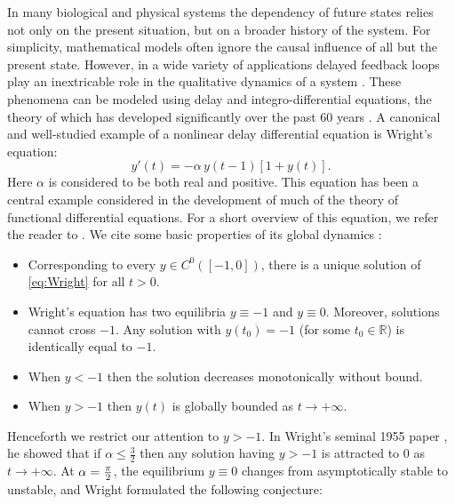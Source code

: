 
In many biological and physical systems the dependency of future states relies not only on the present situation, but on a broader history of the system. 
For simplicity, mathematical models often ignore the causal influence of all but the present state.  
However, in a wide variety of applications delayed feedback loops play an inextricable role in the qualitative dynamics of a system \cite{kolmanovskii2013introduction}. 
These phenomena can be modeled using delay and integro-differential equations, the theory of which has developed significantly over the past 60 years \cite{Hale2006}. 
A canonical and well-studied example of a nonlinear delay differential equation is Wright's equation:
\begin{equation}
y'(t) = - \alpha \,y(t-1) \left[  1+ y(t)  \right] .
\label{eq:Wright}
\end{equation}
Here $\alpha$ is considered to be both real and positive. 
This equation has been a central example considered in the development of much of the theory of functional differential equations. 
For a short overview of this equation, we refer the reader to \cite{hale1971functional}. We cite some basic properties of its global dynamics \cite{wright1955non}:  
\begin{itemize}
	\item Corresponding to every 
	 $y \in C^0([-1,0])$, there is a unique solution of 
 \eqref{eq:Wright}  for all $t>0$.
	\item Wright's equation has two equilibria $ y \equiv -1$ and $ y \equiv 0$. Moreover, 
	solutions cannot cross $-1$. Any solution with $y(t_0)=-1$ (for some $t_0 \in \mathbb{R}$) is identically equal to $-1$.
	\item When $y<-1$ then the solution decreases monotonically without bound.
	 \item When $ y > -1$ then $ y(t) $ is globally bounded as $ t \to + \infty$. 
\end{itemize}



Henceforth we restrict our attention to $y>-1$.
In Wright’s seminal 1955 paper \cite{wright1955non}, he showed that if $ \alpha \leq \tfrac{3}{2}$ then any solution having $ y > -1$ is attracted to $ 0$ as $ t \to + \infty$.  
At $ \alpha = \tfrac{\pi}{2}$, the equilibrium $ y \equiv 0$ changes from asymptotically stable to unstable, and Wright formulated the following  conjecture: 

